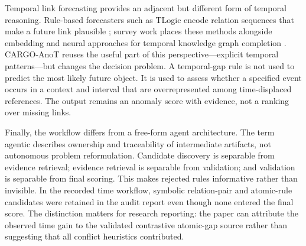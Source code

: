 Temporal link forecasting provides an adjacent but different form of temporal reasoning. Rule-based forecasters such as TLogic encode relation sequences that make a future link plausible \cite{Liu_2022}; survey work places these methods alongside embedding and neural approaches for temporal knowledge graph completion \cite{Cai_2023}. CARGO-AnoT reuses the useful part of this perspective---explicit temporal patterns---but changes the decision problem. A temporal-gap rule is not used to predict the most likely future object. It is used to assess whether a specified event occurs in a context and interval that are overrepresented among time-displaced references. The output remains an anomaly score with evidence, not a ranking over missing links.

Finally, the workflow differs from a free-form agent architecture. The term agentic describes ownership and traceability of intermediate artifacts, not autonomous problem reformulation. Candidate discovery is separable from evidence retrieval; evidence retrieval is separable from validation; and validation is separable from final scoring. This makes rejected rules informative rather than invisible. In the recorded time workflow, symbolic relation-pair and atomic-rule candidates were retained in the audit report even though none entered the final score. The distinction matters for research reporting: the paper can attribute the observed time gain to the validated contrastive atomic-gap source rather than suggesting that all conflict heuristics contributed.

